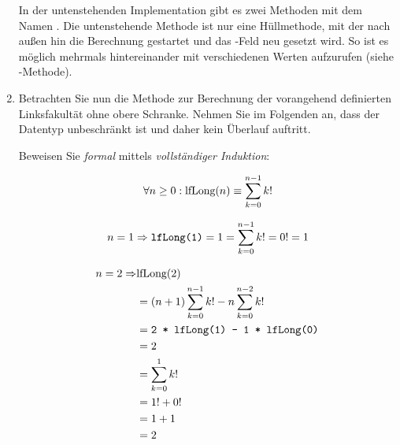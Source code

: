 \documentclass{bschlangaul-aufgabe}
\begin{document}
\begin{enumerate}
\begin{bAntwort}
In der untenstehenden Implementation gibt es zwei Methoden mit dem Namen
. Die untenstehende Methode ist nur eine Hüllmethode, mit
der nach außen hin die Berechnung gestartet und das
-Feld neu gesetzt wird. So ist es möglich
 mehrmals hintereinander mit verschiedenen Werten
aufzurufen (siehe -Methode).

\end{bAntwort}


\item Betrachten Sie nun die Methode  zur
Berechnung der vorangehend definierten Linksfakultät ohne obere
Schranke. Nehmen Sie im Folgenden an, dass der Datentyp
 unbeschränkt ist und daher kein Überlauf auftritt.


Beweisen Sie \emph{formal} mittels \emph{vollständiger Induktion}:

\begin{displaymath}
\forall n \geq 0: \text{lfLong}(n) \equiv \sum^{n - 1}_{k=0}k!
\end{displaymath}

\begin{bAntwort}

%

\bInduktionAnfang

\begin{displaymath}
n=1 \Rightarrow
\texttt{\text{lfLong}(1)} =
1 =
\sum^{n - 1}_{k=0}k! =
0! =
1
\end{displaymath}

\begin{equation*}
\begin{split}
n=2 \Rightarrow & \text{lfLong}(2)\\
& = (n + 1) \sum^{n - 1}_{k=0}k! - n \sum^{n-2}_{k=0}k! \\
& = \texttt{2 * \text{lfLong}(1) - 1 * \text{lfLong}(0)} \\
& = 2 \\
& = \sum^{1}_{k=0}k! \\
& = 1! + 0! \\
& = 1 + 1 \\
& = 2
\end{split}
\end{equation*}

%

\bInduktionVoraussetzung


\end{bAntwort}
\end{enumerate}
\end{document}
